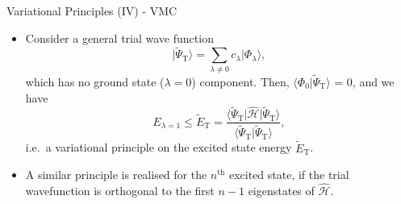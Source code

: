 \documentclass[12pt, pdf, hyperref={draft}, usenames, dvipsnames,
aspectratio=169]{beamer}
\newcommand{\ket}[1]{\lvert{#1}\rangle}
\newcommand{\bra}[1]{\langle{#1}\rvert}
\newcommand{\blue}[1]{{\bf\color{NavyBlue}{#1}}}
\newcommand{\green}[1]{{\bf\color{ForestGreen}{#1}}}
\newcommand{\tpt}{{\tilde\Psi}_{\text{T}}}
\begin{document}
\begin{frame}{Variational Principles (IV) - VMC}

%
%
%
%

\begin{itemize}
  \item Consider a general trial wave function
  \begin{equation}
  \ket{\tpt} = \displaystyle\sum_{\lambda \neq 0}c_\lambda
  \ket{\Phi_\lambda},
  \end{equation}
  which has no ground state ($\lambda = 0$) component. Then, $\bra{\Phi_0}\tpt
  \rangle$ = 0, and we have
  \begin{equation}
    E_{\lambda = 1} \leq \tilde E_{\text{T}} =
    \dfrac{\bra{\tpt}\mathcal{\hat H}\ket{\tpt}}
    {\bra{\tpt} \tpt \rangle},
  \end{equation}
  i.e.\ a variational principle on the excited state energy
  $\tilde E_{\text{T}}$.
  \item A similar principle is realised for the $n^{\text{th}}$ excited state,
  if the trial wavefunction is orthogonal to the first $n-1$ eigenstates of
  $\mathcal{\hat H}$.

\end{itemize}

\end{frame}

\end{document}
